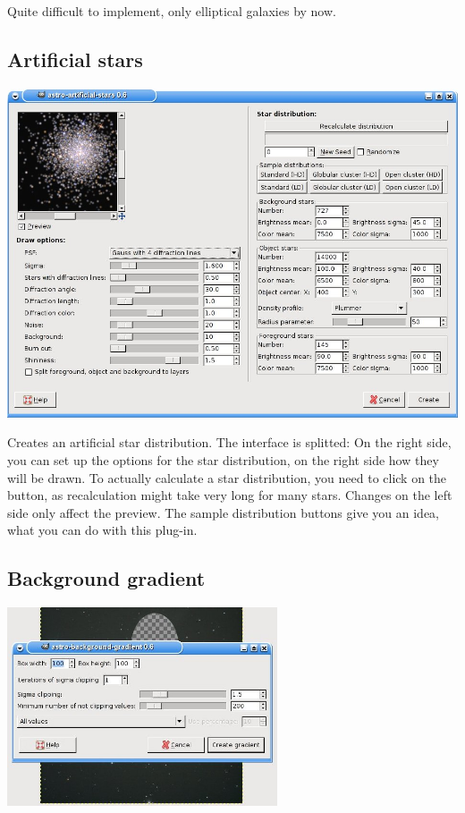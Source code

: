 \documentclass[a4paper]{article}
\begin{document}
Quite difficult to implement, only elliptical galaxies by now.

\subsection{Artificial stars}

\begin{center}\includegraphics[width=1.0\textwidth]{artificial_stars.jpg}\end{center}
% 
% 

Creates an artificial star distribution.
The interface is splitted: On the right side, you can set up the options for the star distribution, on the right side how they will be drawn. To actually calculate a star distribution, you need to click on the button, as recalculation might take very long for many stars.
Changes on the left side only affect the preview.
The sample distribution buttons give you an idea, what you can do with this plug-in.

\subsection{Background gradient}

\begin{center}\includegraphics[width=0.6\textwidth]{background_gradient.jpg}\end{center}
\end{document}
